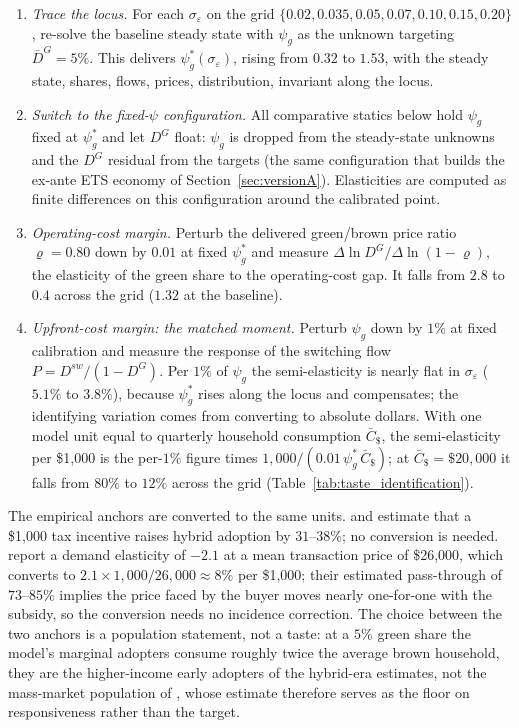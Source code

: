 \begin{enumerate}\itemsep3pt
\item \emph{Trace the locus.} For each $\sigma_\varepsilon$ on the grid
$\{0.02, 0.035, 0.05, 0.07, 0.10, 0.15, 0.20\}$, re-solve the baseline steady
state with $\psi_g$ as the unknown targeting $\bar D^G = 5\%$. This delivers
$\psi_g^*(\sigma_\varepsilon)$, rising from $0.32$ to $1.53$, with the steady
state, shares, flows, prices, distribution, invariant along the locus.

\item \emph{Switch to the fixed-$\psi$ configuration.} All comparative statics
below hold $\psi_g$ fixed at $\psi_g^*$ and let $D^G$ float: $\psi_g$ is dropped
from the steady-state unknowns and the $D^G$ residual from the targets (the same
configuration that builds the ex-ante ETS economy of
Section~\ref{sec:versionA}). Elasticities are computed as finite differences on
this configuration around the calibrated point.

\item \emph{Operating-cost margin.} Perturb the delivered green/brown price
ratio $\varrho = 0.80$ down by $0.01$ at fixed $\psi_g^*$ and measure
$\Delta \ln D^G / \Delta \ln (1-\varrho)$, the elasticity of the green share to
the operating-cost gap. It falls from $2.8$ to $0.4$ across the grid ($1.32$ at
the baseline).

\item \emph{Upfront-cost margin: the matched moment.} Perturb $\psi_g$ down by
$1\%$ at fixed calibration and measure the response of the switching flow
$P = D^{sw}/(1-D^G)$. Per $1\%$ of $\psi_g$ the semi-elasticity is nearly flat
in $\sigma_\varepsilon$ ($5.1\%$ to $3.8\%$), because $\psi_g^*$ rises along the
locus and compensates; the identifying variation comes from converting to
absolute dollars. With one model unit equal to quarterly household consumption
$\bar C_{\$}$, the semi-elasticity per \$1{,}000 is the per-$1\%$ figure times
$1{,}000/(0.01\,\psi_g^*\,\bar C_{\$})$; at $\bar C_{\$} = \$20{,}000$ it falls
from $80\%$ to $12\%$ across the grid
(Table~\ref{tab:taste_identification}).
\end{enumerate}

The empirical anchors are converted to the same units.
\citet{GallagherMuehlegger2011} and \citet{Chandra2010} estimate that a
\$1{,}000 tax incentive raises hybrid adoption by $31$--$38\%$; no conversion is
needed. \citet{MuehleggerRapson2022} report a demand elasticity of $-2.1$ at a
mean transaction price of \$26{,}000, which converts to
$2.1 \times 1{,}000/26{,}000 \approx 8\%$ per \$1{,}000; their estimated
pass-through of $73$--$85\%$ implies the price faced by the buyer moves nearly
one-for-one with the subsidy, so the conversion needs no incidence correction.
The choice between the two anchors is a population statement, not a taste: at a
$5\%$ green share the model's marginal adopters consume roughly twice the
average brown household, they are the higher-income early adopters of the
hybrid-era estimates, not the mass-market population of
\citet{MuehleggerRapson2022}, whose estimate therefore serves as the floor on
responsiveness rather than the target.

